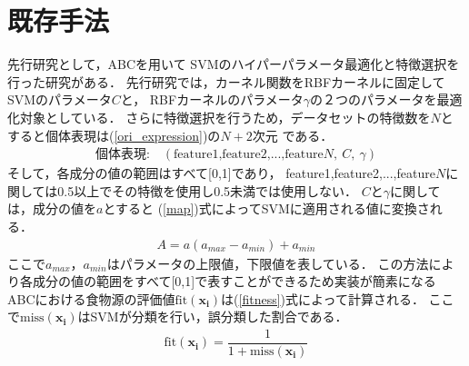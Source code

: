 \section{既存手法}
先行研究として，ABCを用いて
SVMのハイパーパラメータ最適化と特徴選択を行った研究がある\cite{origin}．
先行研究では，カーネル関数をRBFカーネルに固定してSVMのパラメータ$C$と，
RBFカーネルのパラメータ$\gamma$の２つのパラメータを最適化対象としている．
さらに特徴選択を行うため，データセットの特徴数を$N$とすると個体表現は(\ref{ori_expression})の$N+2$次元
である．
\begin{align}
  \text{個体表現:} \quad  (\text{feature1,feature2,...,feature}N,~C,~\gamma)\label{ori_expression}
\end{align}
そして，各成分の値の範囲はすべて[0,1]であり，
feature1,feature2,...,feature$N$に関しては0.5以上でその特徴を使用し0.5未満では使用しない．
$C$と$\gamma$に関しては，成分の値を$a$とすると
(\ref{map})式によってSVMに適用される値に変換される．
\begin{align}
  \label{map}
  A =a(a_{max} -a_{min}) + a_{min}
\end{align}
ここで$a_{max}$，$a_{min}$はパラメータの上限値，下限値を表している．
この方法により各成分の値の範囲をすべて[0,1]で表すことができるため実装が簡素になる
ABCにおける食物源の評価値$\mathrm{fit}(\boldsymbol{x_{i}})$は(\ref{fitness})式によって計算される．
ここで$\mathrm{miss}(\boldsymbol{x_{i}})$はSVMが分類を行い，誤分類した割合である．
\begin{align}
    \label{fitness}
    \mathrm{fit}(\boldsymbol{x_{i}}) = \dfrac{1}{1+ \mathrm{miss}(\boldsymbol{x_{i}})}
\end{align}